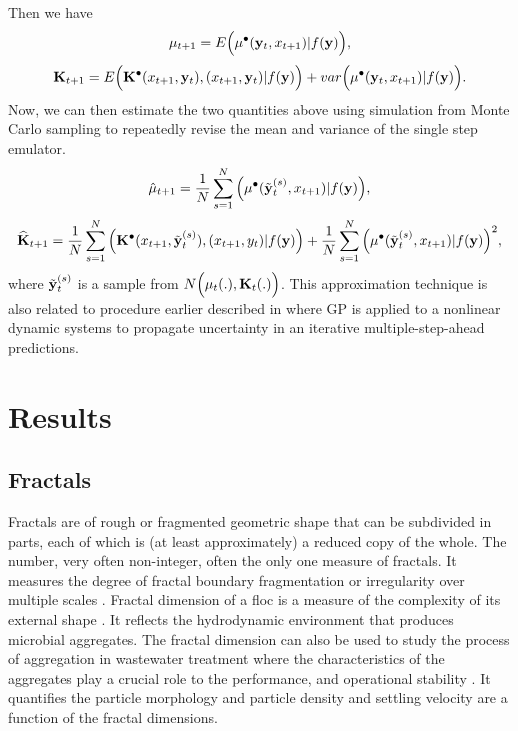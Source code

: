 Then we have
\begin{equation}
\mu_{t+1}=E\Big(\mu^{\bullet}({\bf y}_t, x_{t+1})|f({\bf y})\Big),
\end{equation}
\begin{equation}
{\mathbf{K}}_{t+1}=E\Big({\mathbf{K}}^{\bullet}(x_{t+1},{\bf y}_t),(x_{t+1},{\bf y}_t)|f({\bf y})\Big) +var \Big(\mu^{\bullet}({\bf y}_t, x_{t+1})|f({\bf y})\Big).
\end{equation}
 Now, we can then estimate the two quantities above using simulation from Monte Carlo sampling to repeatedly revise the mean and variance of the single step emulator.
\begin{equation}
\hat \mu_{t+1}=\frac{1}{N}\sum \limits_{s=1}^N\Big(\mu^{\bullet}({\tilde {\bf y}}^{(s)}_t, x_{t+1})|f({\bf y})\Big),
\end{equation}
\begin{equation}
\widehat {{\mathbf{K}}}_{t+1}= \frac{1}{N}\sum \limits_{s=1}^N\Big({\mathbf{K}}^{\bullet}(x_{t+1},{\tilde {\bf y}}^{(s)}_t),(x_{t+1},y_t)|f({\bf y})\Big) +\frac{1}{N}\sum \limits_{s=1}^N \Big(\mu^{\bullet}({\tilde {\bf y}}^{(s)}_t, x_{t+1})|f({\bf y})\Big)^2,
\end{equation}
where ${\tilde {\bf y}}^{(s)}_t$ is a sample from $N\Big(\mu_t(.), {\mathbf{K}}_t(.)\Big)$. This approximation technique is also related to procedure earlier described in \citet{pd17,pd29,pd30} where  GP is applied to a nonlinear dynamic systems to propagate uncertainty in an iterative multiple-step-ahead predictions.

\section{Results}

\subsection{Fractals}
Fractals are of rough or fragmented geometric shape that can be subdivided in parts, each
of which is (at least approximately) a reduced copy of the whole. The number, very often non-integer, often the only one measure of fractals. It measures the degree of fractal boundary fragmentation or irregularity over multiple scales \citet{co8}.
Fractal dimension of a floc is a measure of the complexity of its external shape \citep{co7}. It reflects the hydrodynamic environment that produces microbial aggregates. The fractal dimension can also be used to study the process of aggregation in wastewater treatment where the
characteristics of the aggregates play a crucial role to the performance, and operational stability \citet{co6}. It quantifies the particle morphology and particle density and settling velocity are a
function of the fractal dimensions.

